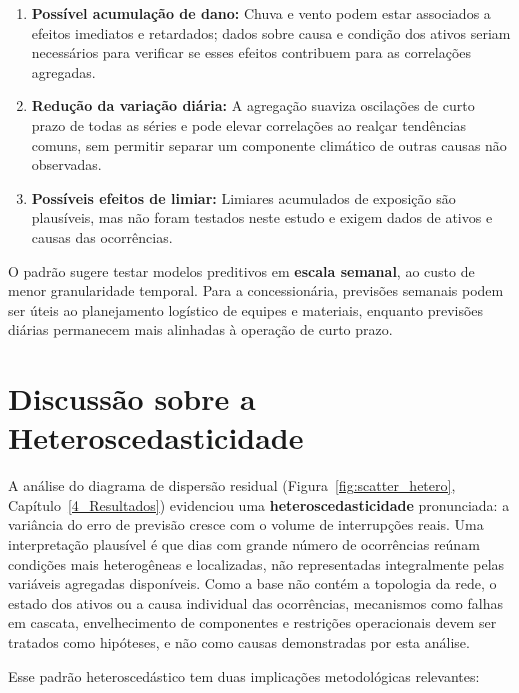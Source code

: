 \begin{enumerate}
    \item \textbf{Possível acumulação de dano:} Chuva e vento podem estar associados a efeitos imediatos e retardados; dados sobre causa e condição dos ativos seriam necessários para verificar se esses efeitos contribuem para as correlações agregadas.

    \item \textbf{Redução da variação diária:} A agregação suaviza oscilações de curto prazo de todas as séries e pode elevar correlações ao realçar tendências comuns, sem permitir separar um componente climático de outras causas não observadas.

    \item \textbf{Possíveis efeitos de limiar:} Limiares acumulados de exposição são plausíveis, mas não foram testados neste estudo e exigem dados de ativos e causas das ocorrências.
\end{enumerate}

O padrão sugere testar modelos preditivos em \textbf{escala semanal}, ao custo de menor granularidade temporal. Para a concessionária, previsões semanais podem ser úteis ao planejamento logístico de equipes e materiais, enquanto previsões diárias permanecem mais alinhadas à operação de curto prazo.

\section{Discussão sobre a Heteroscedasticidade}

A análise do diagrama de dispersão residual (Figura~\ref{fig:scatter_hetero}, Capítulo~\ref{4_Resultados}) evidenciou uma \textbf{heteroscedasticidade} pronunciada: a variância do erro de previsão cresce com o volume de interrupções reais. Uma interpretação plausível é que dias com grande número de ocorrências reúnam condições mais heterogêneas e localizadas, não representadas integralmente pelas variáveis agregadas disponíveis. Como a base não contém a topologia da rede, o estado dos ativos ou a causa individual das ocorrências, mecanismos como falhas em cascata, envelhecimento de componentes e restrições operacionais devem ser tratados como hipóteses, e não como causas demonstradas por esta análise.

Esse padrão heteroscedástico tem duas implicações metodológicas relevantes:


